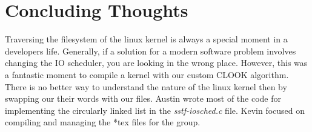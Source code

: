 \documentclass[onecolumn, draftclsnofoot,10pt, compsoc]{IEEEtran}
\begin{document}
        \section{Concluding Thoughts}
        Traversing the filesystem of the linux kernel is always a special moment in a developers life. Generally, if a solution for a modern software problem involves changing the IO scheduler, you are looking in the wrong place. However, this was a fantastic moment to compile a kernel with our custom CLOOK algorithm. There is no better way to understand the nature of the linux kernel then by swapping our their words with our files. Austin wrote most of the code for implementing the circularly linked list in the \textit{sstf-iosched.c} file. Kevin focused on compiling and managing the *tex files for the group. 
		
        
        
\end{document}
